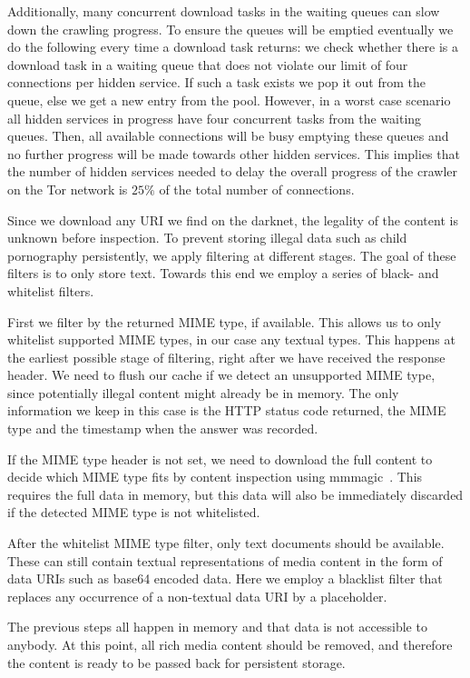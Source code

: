 Additionally, many concurrent download tasks in the waiting queues can slow down the crawling progress.
To ensure the queues will be emptied eventually we do the following every time a download task returns: we
check whether there is a download task in a waiting queue that does not violate our limit of four connections per hidden service. If such a task exists we pop it out from the queue, else we get a new entry from the pool. However, in a worst case scenario all hidden services in progress have four concurrent tasks from the waiting queues. Then, all available connections will be busy emptying these queues and no further progress will be made towards other hidden services. This implies that the number of hidden services needed to delay the overall progress of the crawler on the Tor network is $25\%$ of the total number of connections.


Since we download any URI we find on the darknet, the legality of the content is unknown before inspection. To prevent storing illegal data such as child pornography persistently, we apply filtering at different stages. The goal of these filters is to only store text. Towards this end we employ a series of black- and whitelist filters.

First we filter by the returned MIME type, if available. This allows us to only whitelist supported MIME types, in our case any textual types. This happens at the earliest possible stage of filtering, right after we have received the response header. We need to flush our cache if we detect an unsupported MIME type, since potentially illegal content might already be in memory. The only information we keep in this case is the HTTP status code returned, the MIME type and the timestamp when the answer was recorded.

If the MIME type header is not set, we need to download the full content to decide which MIME type fits by content inspection using mmmagic~\cite{mscdex}. This requires the full data in memory, but this data will also be immediately discarded if the detected MIME type is not whitelisted.

After the whitelist MIME type filter, only text documents should be available. These can still contain textual representations of media content in the form of data URIs such as base64 encoded data. Here we employ a blacklist filter that replaces any occurrence of a non-textual data URI by a placeholder. 

The previous steps all happen in memory and that data is not accessible to anybody. At this point, all rich media content should be removed, and therefore the content is ready to be passed back for persistent storage. 
%
%
